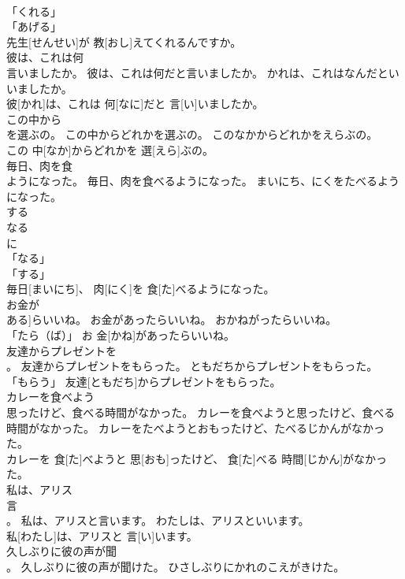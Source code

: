 \documentclass[8pt]{extreport}
\begin{document}
\begin{CJK}{UTF8}{min}
\\	「くれる」 
\\	「あげる」 
\\	先生[せんせい]が 教[おし]えてくれるんですか。		
\\	彼は、これは何
\\	言いましたか。	彼は、これは何だと言いましたか。	かれは、これはなんだといいましたか。	
\\	彼[かれ]は、これは 何[なに]だと 言[い]いましたか。		
\\	この中から
\\	を選ぶの。	この中からどれかを選ぶの。	このなかからどれかをえらぶの。	
\\	この 中[なか]からどれかを 選[えら]ぶの。		
\\	毎日、肉を食
\\	ようになった。	毎日、肉を食べるようになった。	まいにち、にくをたべるようになった。	
\\	する 
\\	なる 
\\	に 
\\	「なる」 
\\	「する」 
\\	毎日[まいにち]、 肉[にく]を 食[た]べるようになった。		
\\	お金が
\\	ある]らいいね。	お金があったらいいね。	おかねがったらいいね。	
\\	「たら（ば）」	お 金[かね]があったらいいね。		
\\	友達からプレゼントを
\\	。	友達からプレゼントをもらった。	ともだちからプレゼントをもらった。	
\\	「もらう」	友達[ともだち]からプレゼントをもらった。		
\\	カレーを食べよう
\\	思ったけど、食べる時間がなかった。	カレーを食べようと思ったけど、食べる時間がなかった。	カレーをたべようとおもったけど、たべるじかんがなかった。	
\\	カレーを 食[た]べようと 思[おも]ったけど、 食[た]べる 時間[じかん]がなかった。		
\\	私は、アリス
\\	言
\\	。	私は、アリスと言います。	わたしは、アリスといいます。	
\\	私[わたし]は、アリスと 言[い]います。		
\\	久しぶりに彼の声が聞
\\	。	久しぶりに彼の声が聞けた。	ひさしぶりにかれのこえがきけた。	

\end{CJK}
\end{document}
